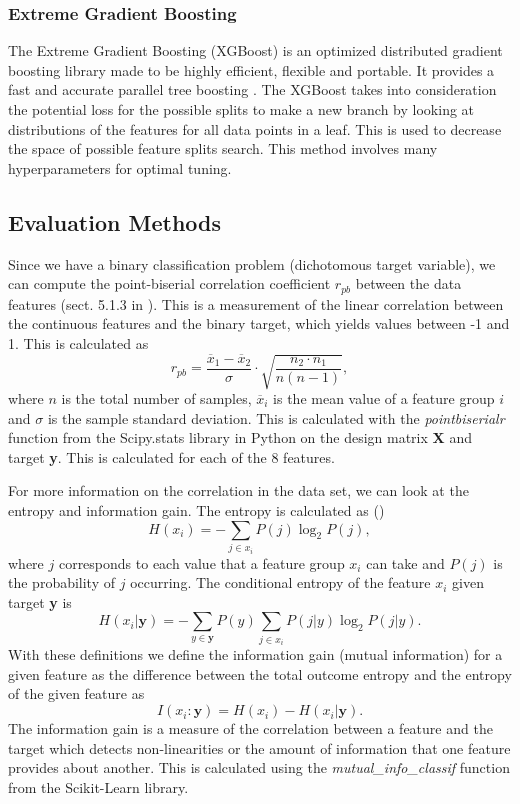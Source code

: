 \documentclass[12pt,a4paper,english]{article}
\begin{document}
\subsubsection{Extreme Gradient Boosting}
\label{subsubsect:XGB}
The Extreme Gradient Boosting (XGBoost) is an optimized distributed gradient boosting library made to be highly efficient, flexible and portable. It provides a fast and accurate parallel tree boosting \cite{lect_trees}. The XGBoost takes into consideration the potential loss for the possible splits to make a new branch by looking at distributions of the features for all data points in a leaf. This is used to decrease the space of possible feature splits search. This method involves many hyperparameters for optimal tuning. 

\subsection{Evaluation Methods}
\label{subsect:eval_methods}
Since we have a binary classification problem (dichotomous target variable), we can compute the point-biserial correlation coefficient $r_{pb}$ between the data features (sect. 5.1.3 in \citet{pulsar_art}). This is a measurement of the linear correlation between the continuous features and the binary target, which yields values between -1 and 1. This is calculated as 
\begin{equation}
\label{eq:point_biserial}
r_{pb}=\frac{\overline{x}_1-\overline{x}_2}{\sigma}\cdot\sqrt{\frac{n_2\cdot n_1}{n(n-1)}},
\end{equation}
where $n$ is the total number of samples, $\overline{x}_i$ is the mean value of a feature group $i$ and $\sigma$ is the sample standard deviation. This is calculated with the \textit{pointbiserialr} function from the Scipy.stats library in Python on the design matrix \textbf{X} and target \textbf{y}. This is calculated for each of the 8 features.

For more information on the correlation in the data set, we can look at the entropy and information gain. The entropy is calculated as (\cite{pulsar_art})
\begin{equation*}
H(x_i)=-\sum_{j\in x_i}P(j)\log_2P(j),
\end{equation*}
where $j$ corresponds to each value that a feature group $x_i$ can take and $P(j)$ is the probability of $j$ occurring. The conditional entropy of the feature $x_i$ given target \textbf{y} is 
\begin{equation*}
H(x_i|\textbf{y})=-\sum_{y\in\textbf{y}}P(y)\sum_{j\in x_i}P(j|y)\log_2P(j|y).
\end{equation*} 
With these definitions we define the information gain (mutual information) for a given feature as the difference between the total outcome entropy and the entropy of the given feature as
\begin{equation}
\label{eq:inf_gain}
I(x_i:\textbf{y})=H(x_i)-H(x_i|\textbf{y}).
\end{equation}
The information gain is a measure of the correlation between a feature and the target which detects non-linearities or the amount of information that one feature provides about another. This is calculated using the \textit{mutual\_info\_classif} function from the Scikit-Learn library.
\end{document}
